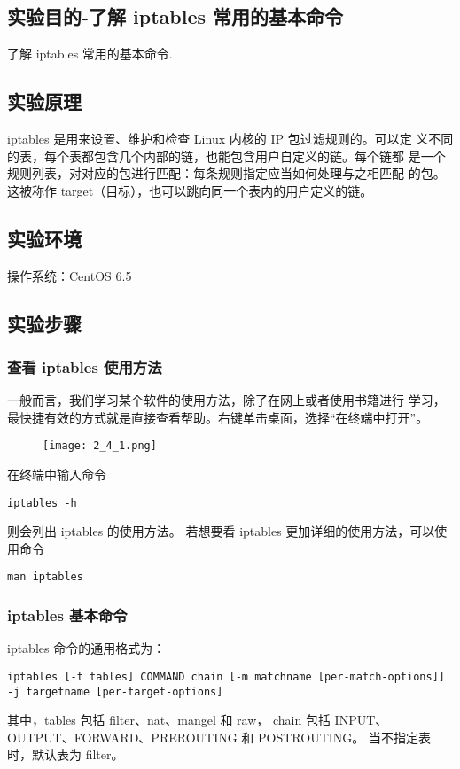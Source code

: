 \subsection{实验目的-了解 iptables 常用的基本命令}
了解 iptables 常用的基本命令.
%
\subsection{实验原理}
iptables 是用来设置、维护和检查 Linux 内核的 IP 包过滤规则的。可以定
义不同的表，每个表都包含几个内部的链，也能包含用户自定义的链。每个链都
是一个规则列表，对对应的包进行匹配：每条规则指定应当如何处理与之相匹配
的包。这被称作 target（目标），也可以跳向同一个表内的用户定义的链。
%
\subsection{实验环境}
操作系统：CentOS 6.5
%
\subsection{实验步骤}
\subsubsection{查看 iptables 使用方法}
一般而言，我们学习某个软件的使用方法，除了在网上或者使用书籍进行
学习，最快捷有效的方式就是直接查看帮助。右键单击桌面，选择``在终端中打开''。
\begin{figure}[H]
  \begin{center}
    \texttt{[image: 2\_4\_1.png]}
  \end{center}
\end{figure}

在终端中输入命令
\begin{verbatim}
iptables -h
\end{verbatim}
则会列出 iptables 的使用方法。
若想要看 iptables 更加详细的使用方法，可以使用命令
\begin{verbatim}
man iptables
\end{verbatim}
%
\subsubsection{iptables 基本命令}
iptables 命令的通用格式为：
\begin{verbatim}
iptables [-t tables] COMMAND chain [-m matchname [per-match-options]] -j targetname [per-target-options]
\end{verbatim}
其中，tables 包括 filter、nat、mangel 和 raw，
chain 包括 INPUT、OUTPUT、FORWARD、PREROUTING 和 POSTROUTING。
当不指定表时，默认表为 filter。

